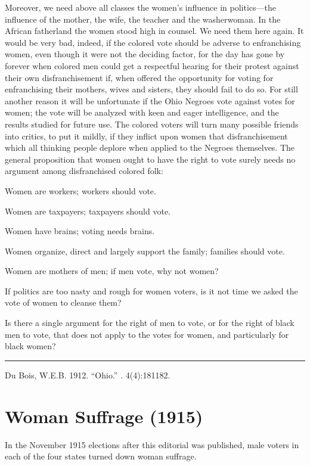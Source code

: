 \documentclass[letterpaper,10pt,english]{jupyterBook}
\begin{document}
\sphinxAtStartPar
Moreover, we need above all classes the women’s influence in politics—the influence of the mother, the wife, the teacher and the washerwoman. In the African fatherland the women stood high in counsel. We need them here again. It would be very bad, indeed, if the colored vote should be adverse to enfranchising women, even though it were not the deciding factor, for the day has gone by forever when colored men could get a respectful hearing for their protest against their own disfranchisement if, when offered the opportunity for voting for enfranchising their mothers, wives and sisters, they should fail to do so. For still another reason it will be unfortunate if the Ohio Negroes vote against votes for women; the vote will be analyzed with keen and eager intelligence, and the results studied for future use. The colored voters will turn many possible friends into critics, to put it mildly, if they inflict upon women that disfranchisement which all thinking people deplore when applied to the Negroes themselves. The general proposition that women ought to have the right to vote surely needs no argument among disfranchised colored folk:

\sphinxAtStartPar
Women are workers; workers should vote.

\sphinxAtStartPar
Women are taxpayers; taxpayers should vote.

\sphinxAtStartPar
Women have brains; voting needs brains.

\sphinxAtStartPar
Women organize, direct and largely support the family; families should vote.

\sphinxAtStartPar
Women are mothers of men; if men vote, why not women?

\sphinxAtStartPar
If politics are too nasty and rough for women voters, is it not time we asked the vote of women to cleanse them?

\sphinxAtStartPar
Is there a single argument for the right of men to vote, or for the right of black men to vote, that does not apply to the votes for women, and particularly for black women?


\bigskip\hrule\bigskip


\sphinxAtStartPar
{} Du Bois, W.E.B. 1912. “Ohio.”  . 4(4):181\sphinxhyphen{}182.


\section{Woman Suffrage (1915)}
\label{\detokenize{Volumes/09/06/womansuffrage:woman-suffrage-1915}}\label{\detokenize{Volumes/09/06/womansuffrage::doc}}
\begin{sphinxShadowBox}
\sphinxstylesidebartitle{}

\sphinxAtStartPar
In the November 1915 elections after this editorial was published, male voters in each of the four states turned down woman suffrage.
\end{sphinxShadowBox}
\end{document}
